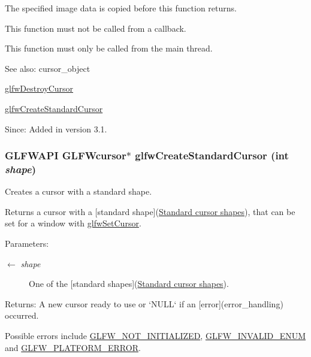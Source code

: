 The specified image data is copied before this function returns.

This function must not be called from a callback.

This function must only be called from the main thread.

\begin{Desc}
\item[See also:]cursor\_\-object 

\hyperlink{group__input_g27556b7122117bc1bbb4bb3cc003ea43}{glfwDestroyCursor} 

\hyperlink{group__input_g969dd87ad2ddbf3e1086cc40f235eed1}{glfwCreateStandardCursor}\end{Desc}
\begin{Desc}
\item[Since:]Added in version 3.1. \end{Desc}
\hypertarget{group__input_g969dd87ad2ddbf3e1086cc40f235eed1}{
\subsubsection[glfwCreateStandardCursor]{\setlength{\rightskip}{0pt plus 5cm}GLFWAPI {\bf GLFWcursor}$\ast$ glfwCreateStandardCursor (int {\em shape})}}
\label{group__input_g969dd87ad2ddbf3e1086cc40f235eed1}


Creates a cursor with a standard shape. 

Returns a cursor with a \mbox{[}standard shape\mbox{]}(\hyperlink{group__shapes}{Standard cursor shapes}), that can be set for a window with \hyperlink{group__input_gfaf103cea2f43530cff7de4e01126a4f}{glfwSetCursor}.

\begin{Desc}
\item[Parameters:]
\begin{description}
\item[\mbox{$\leftarrow$} {\em shape}]One of the \mbox{[}standard shapes\mbox{]}(\hyperlink{group__shapes}{Standard cursor shapes}). \end{description}
\end{Desc}
\begin{Desc}
\item[Returns:]A new cursor ready to use or `NULL` if an \mbox{[}error\mbox{]}(error\_\-handling) occurred.\end{Desc}
Possible errors include \hyperlink{group__errors_g2374ee02c177f12e1fa76ff3ed15e14a}{GLFW\_\-NOT\_\-INITIALIZED}, \hyperlink{group__errors_g76f6bb9c4eea73db675f096b404593ce}{GLFW\_\-INVALID\_\-ENUM} and \hyperlink{group__errors_gd44162d78100ea5e87cdd38426b8c7a1}{GLFW\_\-PLATFORM\_\-ERROR}.

